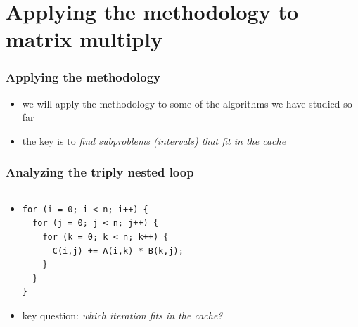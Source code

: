 \documentclass[12pt,dvipdfmx]{beamer}
\newcommand{\ao}[1]{{\color{blue}#1}}
\begin{document}
\section{Applying the methodology to matrix multiply}

\begin{frame}[fragile]
\frametitle{Applying the methodology}
\begin{itemize}

\item we will apply the methodology to some of the 
  algorithms we have studied so far

\item the key is to \ao{\em find subproblems (intervals) that fit in the cache}
\end{itemize}
\end{frame}


\begin{frame}[fragile]
\frametitle{Analyzing the triply nested loop}
\begin{columns}[t]
\begin{column}{0.55\textwidth}
\begin{itemize}
\item []
\begin{lstlisting}
for (i = 0; i < n; i++) {
  for (j = 0; j < n; j++) {
    for (k = 0; k < n; k++) {
      C(i,j) += A(i,k) * B(k,j);
    }
  }
}
\end{lstlisting}
\item key question:
  \ao{\emph{which iteration fits in the cache?}}
\end{itemize}
\end{column}

\begin{column}{0.45\textwidth}
\begin{center}
\def\svgwidth{0.9\textwidth}
{\tiny }
\end{center}
\end{column}
\end{columns}
\end{frame}
\end{document}
